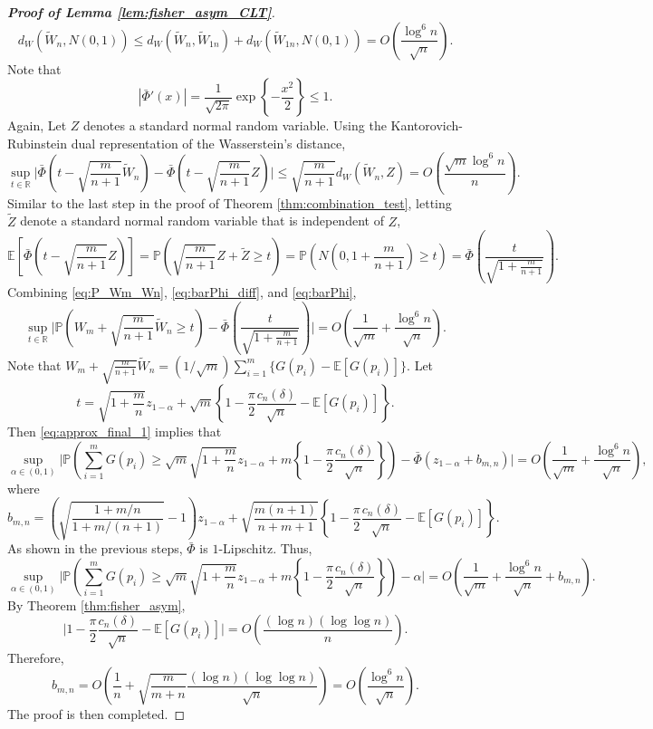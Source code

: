 \documentclass[11pt]{article}
\def\R{\mathbb{R}}
\def\E{\mathbb{E}}
\renewcommand{\P}{\mathbb{P}}
\newcommand{\lb}{\left(}
\newcommand{\rb}{\right)}
\begin{document}
\begin{proof}[\textbf{Proof of Lemma \ref{lem:fisher_asym_CLT}}]
\begin{equation}
  \label{eq:Wn_CLT}
  d_{W}\lb\tilde{W}_{n}, N(0, 1)\rb\le d_{W}\left(\tilde{W}_{n}, \tilde{W}_{1n}\right) + d_{W}\left(\tilde{W}_{1n}, N(0, 1)\right) = O\lb\frac{\log^6 n}{\sqrt{n}}\rb.
\end{equation}
Note that
\[|\bar{\Phi}'(x)| = \frac{1}{\sqrt{2\pi}}\exp\left\{-\frac{x^2}{2}\right\} \le 1.\]
Again, Let $Z$ denotes a standard normal random variable. Using the Kantorovich-Rubinstein dual representation of the Wasserstein's distance,
\begin{equation}
  \label{eq:barPhi_diff}
  \sup_{t\in \R}\bigg|\bar{\Phi}\lb t - \sqrt{\frac{m}{n+1}}\tilde{W}_n\rb - \bar{\Phi}\lb t - \sqrt{\frac{m}{n+1}}Z\rb\bigg| \le \sqrt{\frac{m}{n+1}} d_{W}(\tilde{W}_{n}, Z) = O\lb\frac{\sqrt{m}\log^6 n}{n}\rb.
\end{equation}
Similar to the last step in the proof of Theorem \ref{thm:combination_test}, letting $\tilde{Z}$ denote a standard normal random variable that is independent of $Z$,
\begin{equation}
  \label{eq:barPhi}
  \E\left[\bar{\Phi}\lb t - \sqrt{\frac{m}{n+1}}Z\rb\right] = \P\lb \sqrt{\frac{m}{n+1}}Z + \tilde{Z}\ge t\rb = \P\lb N\lb 0, 1 + \frac{m}{n+1}\rb\ge t\rb = \bar{\Phi}\lb \frac{t}{\sqrt{1 + \frac{m}{n+1}}}\rb.
\end{equation}
Combining \eqref{eq:P_Wm_Wn}, \eqref{eq:barPhi_diff}, and \eqref{eq:barPhi},
\begin{equation}\label{eq:approx_final_1}
  \sup_{t\in \R}\bigg|\P\lb W_{m} + \sqrt{\frac{m}{n+1}}\tilde{W}_{n}\ge t \rb - \bar{\Phi}\lb \frac{t}{\sqrt{1 + \frac{m}{n+1}}}\rb\bigg| = O\lb \frac{1}{\sqrt{m}} + \frac{\log^6 n}{\sqrt{n}}\rb.
\end{equation}
Note that $W_{m} + \sqrt{\frac{m}{n+1}}\tilde{W}_{n} = (1/\sqrt{m})\sum_{i=1}^{m}\{G(p_i) - \E[G(p_i)]\}$. Let
\[t = \sqrt{1 + \frac{m}{n}}z_{1 - \alpha} + \sqrt{m}\left\{ 1 - \frac{\pi}{2}\frac{c_n(\delta)}{\sqrt{n}} - \E[G(p_i)]\right\}.\]
Then \eqref{eq:approx_final_1} implies that
\[\sup_{\alpha\in (0, 1)}\bigg|\P\lb \sum_{i=1}^{m}G(p_i)\ge \sqrt{m}\sqrt{1 + \frac{m}{n}}z_{1- \alpha} + m \left\{ 1 - \frac{\pi}{2}\frac{c_n(\delta)}{\sqrt{n}}\right\}\rb - \bar{\Phi}\lb z_{1-\alpha} + b_{m, n}\rb\bigg| = O\lb \frac{1}{\sqrt{m}} + \frac{\log^6 n}{\sqrt{n}}\rb,\]
where
\[b_{m, n} = \lb\sqrt{\frac{1 + m/n}{1 + m / (n+1)}} - 1\rb z_{1-\alpha} + \sqrt{\frac{m(n + 1)}{n + m + 1}}\left\{ 1 - \frac{\pi}{2}\frac{c_n(\delta)}{\sqrt{n}} - \E[G(p_i)]\right\}.\]
As shown in the previous steps, $\bar{\Phi}$ is $1$-Lipschitz. Thus,
\[\sup_{\alpha\in (0, 1)}\bigg|\P\lb \sum_{i=1}^{m}G(p_i)\ge \sqrt{m}\sqrt{1 + \frac{m}{n}}z_{1- \alpha} + m \left\{ 1 - \frac{\pi}{2}\frac{c_n(\delta)}{\sqrt{n}}\right\}\rb - \alpha\bigg| = O\lb \frac{1}{\sqrt{m}} + \frac{\log^6 n}{\sqrt{n}} + b_{m, n}\rb.\]
By Theorem \ref{thm:fisher_asym},
\[\bigg|1 - \frac{\pi}{2}\frac{c_n(\delta)}{\sqrt{n}} - \E[G(p_i)]\bigg| = O\lb \frac{(\log n)(\log \log n)}{n}\rb.\]
Therefore,
\[b_{m, n} = O\lb \frac{1}{n} + \sqrt{\frac{m}{m+n}}\frac{(\log n)(\log \log n)}{\sqrt{n}}\rb = O\lb\frac{\log^6 n}{\sqrt{n}}\rb.\]
The proof is then completed.
\end{proof}
\end{document}
